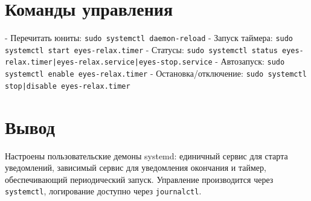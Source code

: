 \section{Команды управления}
- Перечитать юниты: \texttt{sudo systemctl daemon-reload}
- Запуск таймера: \texttt{sudo systemctl start eyes-relax.timer}
- Статусы: \texttt{sudo systemctl status eyes-relax.timer|eyes-relax.service|eyes-stop.service}
- Автозапуск: \texttt{sudo systemctl enable eyes-relax.timer}
- Остановка/отключение: \texttt{sudo systemctl stop|disable eyes-relax.timer}


\section{Вывод}
Настроены пользовательские демоны systemd: единичный сервис для старта уведомлений, зависимый сервис для уведомления окончания и таймер, обеспечивающий периодический запуск. Управление производится через \texttt{systemctl}, логирование доступно через \texttt{journalctl}.

